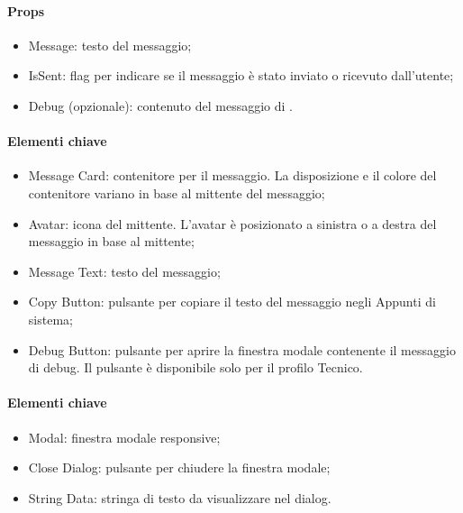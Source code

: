 
\paragraph*{Props}
\begin{itemize}
  \item Message: testo del messaggio;
  \item IsSent: flag per indicare se il messaggio è stato inviato o ricevuto dall'utente;
  \item Debug (opzionale): contenuto del messaggio di .
\end{itemize}

\paragraph*{Elementi chiave}
\begin{itemize}
  \item Message Card: contenitore per il messaggio. La disposizione e il colore del contenitore variano in base al mittente del messaggio;
  \item Avatar: icona del mittente. L'avatar è posizionato a sinistra o a destra del messaggio in base al mittente;
  \item Message Text: testo del messaggio;
  \item Copy Button: pulsante per copiare il testo del messaggio negli Appunti di sistema;
  \item Debug Button: pulsante per aprire la finestra modale contenente il messaggio di debug. Il pulsante è disponibile solo per il profilo Tecnico.
\end{itemize}


\paragraph*{Elementi chiave}
\begin{itemize}
  \item Modal: finestra modale responsive;
  \item Close Dialog: pulsante per chiudere la finestra modale;
  \item String Data: stringa di testo da visualizzare nel dialog.
\end{itemize}



